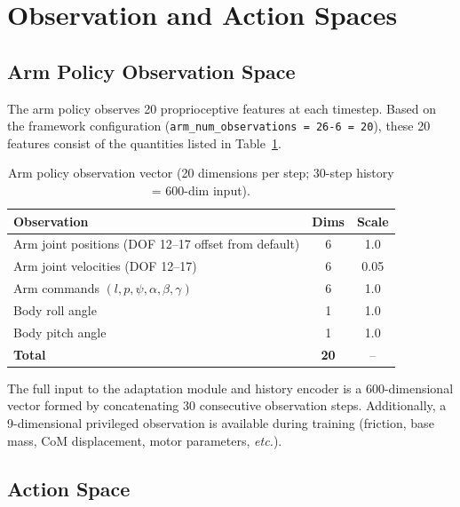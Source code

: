 \section{Observation and Action Spaces}
\label{sec:obs}

\subsection{Arm Policy Observation Space}
\label{sec:arm_obs}

The arm policy observes 20 proprioceptive features at each timestep.
Based on the framework configuration (\texttt{arm\_num\_observations~=~26-6~=~20}),
these 20 features consist of the quantities listed in
Table~\ref{tab:arm_obs}.

\begin{table}[htbp]
  \centering
  \caption{Arm policy observation vector (20 dimensions per step;
           30-step history = 600-dim input).}
  \label{tab:arm_obs}
  \renewcommand{\arraystretch}{1.1}
  \begin{tabular}{lcc}
    \toprule
    \textbf{Observation} & \textbf{Dims} & \textbf{Scale} \\
    \midrule
    Arm joint positions (DOF 12--17 offset from default) & 6  & 1.0 \\
    Arm joint velocities (DOF 12--17)                    & 6  & 0.05 \\
    Arm commands $(l, p, \psi, \alpha, \beta, \gamma)$   & 6  & 1.0 \\
    Body roll angle                                       & 1  & 1.0 \\
    Body pitch angle                                      & 1  & 1.0 \\
    \midrule
    \textbf{Total}                                        & \textbf{20} & -- \\
    \bottomrule
  \end{tabular}
\end{table}

The full input to the adaptation module and history encoder is
a 600-dimensional vector formed by concatenating 30 consecutive
observation steps.
Additionally, a 9-dimensional privileged observation is available
during training (friction, base mass, CoM displacement, motor parameters,
\emph{etc.}).

\subsection{Action Space}
\label{sec:actions}

